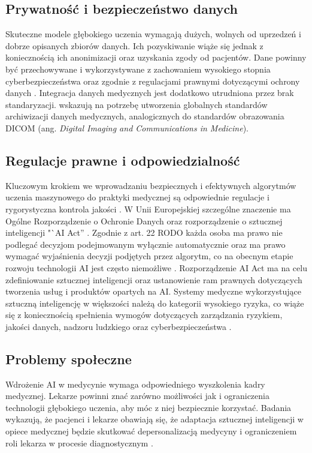 \subsection{Prywatność i bezpieczeństwo danych}
Skuteczne modele głębokiego uczenia wymagają dużych, wolnych od uprzedzeń i dobrze opisanych zbiorów danych.
Ich pozyskiwanie wiąże się jednak z koniecznością ich anonimizacji oraz uzyskania zgody od pacjentów.
Dane powinny być przechowywane i wykorzystywane z zachowaniem wysokiego stopnia cyberbezpieczeństwa oraz zgodnie z regulacjami prawnymi dotyczącymi ochrony danych \cite{Farhud_Zokaei_2021, He_Baxter_Xu_Xu_Zhou_Zhang_2019}.
Integracja danych medycznych jest dodatkowo utrudniona przez brak standaryzacji.
\citet{He_Baxter_Xu_Xu_Zhou_Zhang_2019} wskazują na potrzebę utworzenia globalnych standardów archiwizacji danych medycznych, analogicznych do standardów obrazowania DICOM (ang. \textit{Digital Imaging and Communications in Medicine}).

\subsection{Regulacje prawne i odpowiedzialność}
Kluczowym krokiem we wprowadzaniu bezpiecznych i efektywnych algorytmów uczenia maszynowego do praktyki medycznej są odpowiednie regulacje i rygorystyczna kontrola jakości \cite{Kelly_Karthikesalingam_Suleyman_Corrado_King_2019, He_Baxter_Xu_Xu_Zhou_Zhang_2019}.
W Unii Europejskiej szczególne znaczenie ma Ogólne Rozporządzenie o Ochronie Danych oraz rozporządzenie o sztucznej inteligencji "`AI Act'' \cite{RODO, EU2024AIAct}.
Zgodnie z art. 22 RODO każda osoba ma prawo nie podlegać decyzjom podejmowanym wyłącznie automatycznie oraz ma prawo wymagać wyjaśnienia decyzji podjętych przez algorytm, co na obecnym etapie rozwoju technologii AI jest często niemożliwe \cite{He_Baxter_Xu_Xu_Zhou_Zhang_2019, RODO}.
Rozporządzenie AI Act ma na celu zdefiniowanie sztucznej inteligencji oraz ustanowienie ram prawnych dotyczących tworzenia usług i produktów opartych na AI.
Systemy medyczne wykorzystujące sztuczną inteligencję w większości należą do kategorii wysokiego ryzyka, co wiąże się z koniecznością spełnienia wymogów dotyczących zarządzania ryzykiem, jakości danych, nadzoru ludzkiego oraz cyberbezpieczeństwa \cite{EU2024AIAct, Oirschot_2024}.

\subsection{Problemy społeczne}
Wdrożenie AI w medycynie wymaga odpowiedniego wyszkolenia kadry medycznej.
Lekarze powinni znać zarówno możliwości jak i ograniczenia technologii głębokiego uczenia, aby móc z niej bezpiecznie korzystać.
Badania wykazują, że pacjenci i lekarze obawiają się, że adaptacja sztucznej inteligencji w opiece medycznej będzie skutkować depersonalizacją medycyny i ograniczeniem roli lekarza w procesie diagnostycznym \cite{Tang_Li_Fantus_2023}.

